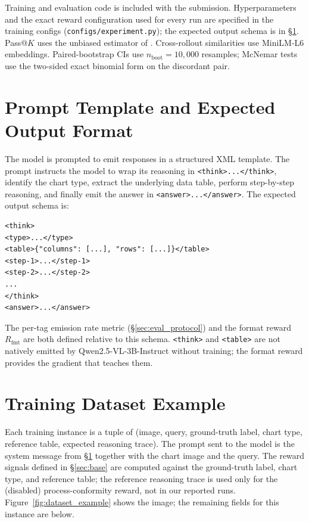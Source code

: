 \documentclass[11pt]{article}
\begin{document}
Training and evaluation code is included with the submission.
Hyperparameters and the exact reward configuration used for every
run are specified in the training configs
(\texttt{configs/experiment.py}); the expected output schema is in
\S\ref{sec:prompt}. Pass@$K$ uses the unbiased estimator of
\citet{passatk}. Cross-rollout similarities use MiniLM-L6
embeddings. Paired-bootstrap CIs use
$n_{\text{boot}}{=}10{,}000$ resamples; McNemar tests use the
two-sided exact binomial form on the discordant pair.

\section{Prompt Template and Expected Output Format}
\label{sec:prompt}

The model is prompted to emit responses in a structured XML template.
The prompt instructs the model to wrap its reasoning in
\texttt{<think>...</think>}, identify the chart type, extract the
underlying data table, perform step-by-step reasoning, and finally
emit the answer in \texttt{<answer>...</answer>}. The expected
output schema is:

\begin{Verbatim}
<think>
<type>...</type>
<table>{"columns": [...], "rows": [...]}</table>
<step-1>...</step-1>
<step-2>...</step-2>
...
</think>
<answer>...</answer>
\end{Verbatim}

The per-tag emission rate metric (\S\ref{sec:eval_protocol}) and the
format reward $R_{\text{fmt}}$ are both defined relative to this
schema. \texttt{<think>} and \texttt{<table>} are not natively
emitted by Qwen2.5-VL-3B-Instruct without training; the format reward
provides the gradient that teaches them.

\section{Training Dataset Example}
\label{sec:dataset_example}

Each training instance is a tuple of (image, query, ground-truth
label, chart type, reference table, expected reasoning trace). The
prompt sent to the model is the system message from
\S\ref{sec:prompt} together with the chart image and the query. The
reward signals defined in \S\ref{sec:base} are computed against the
ground-truth label, chart type, and reference table; the reference
reasoning trace is used only for the (disabled) process-conformity
reward, not in our reported runs. Figure~\ref{fig:dataset_example}
shows the image; the remaining fields for this instance are below.
\end{document}
